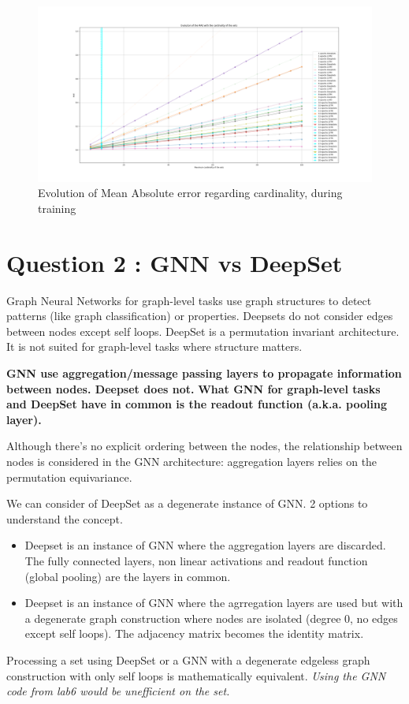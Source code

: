\documentclass[a4paper]{article}
\begin{document}
\begin{figure}[h]
    \centering
    \includegraphics[width=1.\textwidth]{figures/deep_set_performances_MAE_evol.png}
    \caption{Evolution of Mean Absolute error regarding cardinality, during training}
    \label{fig:mean_absolute_error_deepset_lstm_evolution}
\end{figure}


\section*{Question 2 : GNN vs DeepSet}
Graph Neural Networks for graph-level tasks use graph structures to detect patterns (like graph classification) or properties. Deepsets do not consider edges between nodes except self loops. 
DeepSet is a permutation invariant architecture. It is not suited for graph-level tasks where structure matters.

\textbf{GNN use aggregation/message passing layers to propagate information between nodes. Deepset does not.}
\newline
\textbf{What GNN for graph-level tasks and DeepSet have in common is the readout function (a.k.a. pooling layer).}

Although there's no explicit ordering between the nodes, the relationship between nodes is considered in the GNN architecture: aggregation layers relies on the permutation equivariance.

We can consider of DeepSet as a degenerate instance of GNN. 2 options to understand the concept.
\begin{itemize}
    \item Deepset is an instance of GNN where the aggregation layers are discarded. The fully connected layers, non linear activations and readout function (global pooling) are the layers in common.
    \item Deepset is an instance of GNN where the agrregation layers are used but with a degenerate graph construction where nodes are isolated (degree 0, no edges except self loops). The adjacency matrix becomes the identity matrix.
\end{itemize}
Processing a set using DeepSet or a GNN with a degenerate edgeless graph construction with only self loops is mathematically equivalent. \textit{Using the GNN code from lab6 would be unefficient on the set.}
\end{document}

